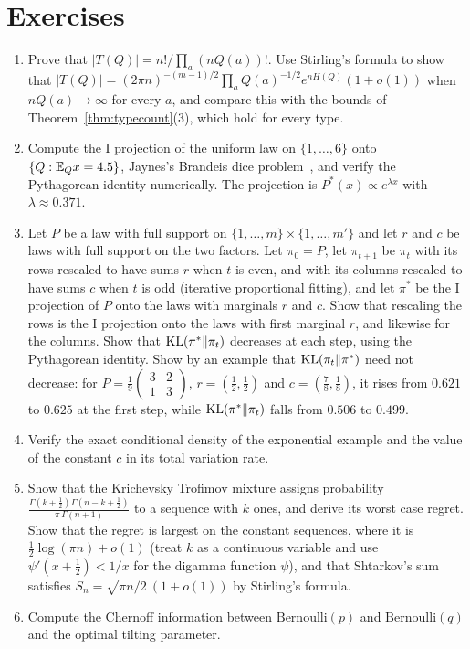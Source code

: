 \section*{Exercises}
\begin{enumerate}
\item Prove that $|T(Q)| = n!/\prod_a(nQ(a))!$. Use Stirling's formula to show that $|T(Q)| = (2\pi n)^{-(m-1)/2}\prod_aQ(a)^{-1/2}e^{nH(Q)}(1+o(1))$ when $nQ(a)\to\infty$ for every $a$, and compare this with the bounds of Theorem~\ref{thm:typecount}(3), which hold for every type.
\item Compute the I projection of the uniform law on $\{1,\dots,6\}$ onto $\{Q:\mathbb{E}_Qx = 4.5\}$, Jaynes's Brandeis dice problem~\cite{jaynes1963}, and verify the Pythagorean identity numerically. The projection is $P^*(x)\propto e^{\lambda x}$ with $\lambda\approx0.371$.
\item\label{ex:ipf} Let $P$ be a law with full support on $\{1,\dots,m\}\times\{1,\dots,m'\}$ and let $r$ and $c$ be laws with full support on the two factors. Let $\pi_0 = P$, let $\pi_{t+1}$ be $\pi_t$ with its rows rescaled to have sums $r$ when $t$ is even, and with its columns rescaled to have sums $c$ when $t$ is odd (iterative proportional fitting), and let $\pi^*$ be the I projection of $P$ onto the laws with marginals $r$ and $c$. Show that rescaling the rows is the I projection onto the laws with first marginal $r$, and likewise for the columns. Show that $\mathrm{KL}(\pi^*\|\pi_t)$ decreases at each step, using the Pythagorean identity. Show by an example that $\mathrm{KL}(\pi_t\|\pi^*)$ need not decrease: for $P = \frac19\begin{pmatrix}3&2\\1&3\end{pmatrix}$, $r = (\frac12,\frac12)$ and $c = (\frac78,\frac18)$, it rises from $0.621$ to $0.625$ at the first step, while $\mathrm{KL}(\pi^*\|\pi_t)$ falls from $0.506$ to $0.499$.
\item Verify the exact conditional density of the exponential example and the value of the constant $c$ in its total variation rate.
\item\label{ex:kt} Show that the Krichevsky Trofimov mixture assigns probability $\frac{\Gamma(k+\frac12)\Gamma(n-k+\frac12)}{\pi\,\Gamma(n+1)}$ to a sequence with $k$ ones, and derive its worst case regret. Show that the regret is largest on the constant sequences, where it is $\frac12\log(\pi n)+o(1)$ (treat $k$ as a continuous variable and use $\psi'(x+\frac12)<1/x$ for the digamma function $\psi$), and that Shtarkov's sum satisfies $S_n = \sqrt{\pi n/2}\,(1+o(1))$ by Stirling's formula.
\item Compute the Chernoff information between $\mathrm{Bernoulli}(p)$ and $\mathrm{Bernoulli}(q)$ and the optimal tilting parameter.
\end{enumerate}
